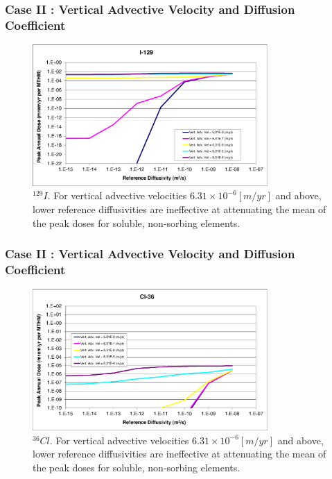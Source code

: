 \begin{frame}[c]
  \frametitle{Case II : Vertical Advective Velocity and Diffusion Coefficient}
\begin{figure}[htp!]
\centering
\includegraphics[width=0.8\textwidth]{AdvVelAndDiffCoeffEBSFail/I-129.eps}
\caption{$^{129}I$. For vertical advective velocities 
$6.31\times10^{-6}[m/yr]$ and above, lower reference diffusivities are 
ineffective at attenuating the mean of the peak doses for soluble, non-sorbing 
elements. 
}
\label{fig:VAdvVelI129}
\end{figure}
\end{frame}

\begin{frame}[c]
  \frametitle{Case II : Vertical Advective Velocity and Diffusion Coefficient}
\begin{figure}[htp!]
\centering
\includegraphics[width=0.8\textwidth]{AdvVelAndDiffCoeffEBSFail/Cl-36.eps}
\caption{$^{36}Cl$.
For vertical advective velocities 
$6.31\times10^{-6}[m/yr]$ and above, lower reference diffusivities are 
ineffective at attenuating the mean of the peak doses for soluble, non-sorbing 
elements. 
}
\label{fig:VAdvVelCl36}
\end{figure}
\end{frame}


